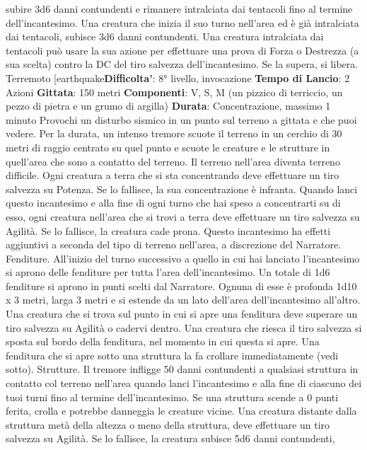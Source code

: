 \begin{multicols}{2}
subire 3d6 danni contundenti e rimanere intralciata dai
tentacoli fino al termine dell’incantesimo. Una creatura
che inizia il suo turno nell’area ed è già intralciata dai
tentacoli, subisce 3d6 danni contundenti.
Una creatura intralciata dai tentacoli può usare la sua
azione per effettuare una prova di Forza o Destrezza (a
sua scelta) contro la DC del tiro salvezza
dell’incantesimo. Se la supera, si libera.
Terremoto
[earthquake\textbf{Difficolta'}:
8° livello, invocazione
\textbf{Tempo di Lancio}: 2 Azioni
\textbf{Gittata}: 150 metri
\textbf{Componenti}: V, S, M (un pizzico di terriccio, un pezzo
di pietra e un grumo di argilla)
\textbf{Durata}: Concentrazione, massimo 1 minuto
Provochi un disturbo sismico in un punto sul terreno a
gittata e che puoi vedere. Per la durata, un intenso
tremore scuote il terreno in un cerchio di 30 metri di
raggio centrato su quel punto e scuote le creature e le
strutture in quell’area che sono a contatto del terreno.
Il terreno nell’area diventa terreno difficile. Ogni
creatura a terra che si sta concentrando deve effettuare
un tiro salvezza su Potenza. Se lo fallisce, la sua
concentrazione è infranta.
Quando lanci questo incantesimo e alla fine di ogni
turno che hai speso a concentrarti su di esso, ogni
creatura nell’area che si trovi a terra deve effettuare un
tiro salvezza su Agilità. Se lo fallisce, la creatura
cade prona.
Questo incantesimo ha effetti aggiuntivi a seconda del
tipo di terreno nell’area, a discrezione del Narratore.
Fenditure. All’inizio del turno successivo a quello in cui
hai lanciato l’incantesimo si aprono delle fenditure per
tutta l’area dell’incantesimo. Un totale di 1d6 fenditure si
aprono in punti scelti dal Narratore. Ognuna di esse è
profonda 1d10 x 3 metri, larga 3 metri e si estende da
un lato dell’area dell’incantesimo all’altro. Una creatura
che si trova sul punto in cui si apre una fenditura deve
superare un tiro salvezza su Agilità o cadervi
dentro. Una creatura che riesca il tiro salvezza si sposta
sul bordo della fenditura, nel momento in cui questa si
apre.
Una fenditura che si apre sotto una struttura la fa
crollare immediatamente (vedi sotto).
Strutture. Il tremore infligge 50 danni contundenti a
qualsiasi struttura in contatto col terreno nell’area
quando lanci l’incantesimo e alla fine di ciascuno dei
tuoi turni fino al termine dell’incantesimo. Se una
struttura scende a 0 punti ferita, crolla e potrebbe
danneggia le creature vicine. Una creatura distante
dalla struttura metà della altezza o meno della struttura,
deve effettuare un tiro salvezza su Agilità. Se lo
fallisce, la creatura subisce 5d6 danni contundenti,

\end{multicols}
